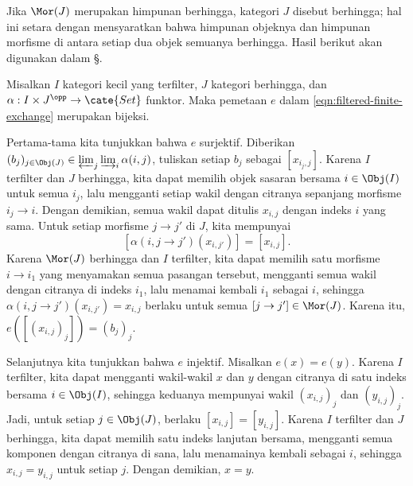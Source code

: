 Jika $\Mor(J)$ merupakan himpunan berhingga, kategori $J$ disebut berhingga;
hal ini setara dengan mensyaratkan bahwa himpunan objeknya dan himpunan
morfisme di antara setiap dua objek semuanya berhingga. Hasil berikut akan
digunakan dalam \S{}.

\begin{proposisi}\label{prop:filtered-finite-exchange}
	Misalkan $I$ kategori kecil yang terfilter, $J$ kategori berhingga, dan
	$\alpha: I \times J^{\opp} \to \cate{Set}$ funktor. Maka pemetaan $e$ dalam
	\eqref{eqn:filtered-finite-exchange} merupakan bijeksi.
\end{proposisi}
\begin{bukti}
	Pertama-tama kita tunjukkan bahwa $e$ surjektif. Diberikan
	$(b_j)_{j \in \Obj(J)} \in \varprojlim_j \varinjlim_i \alpha(i, j)$,
	tuliskan setiap $b_j$ sebagai $[x_{i_j, j}]$. Karena $I$ terfilter dan $J$
	berhingga, kita dapat memilih objek sasaran bersama $i\in\Obj(I)$ untuk
	semua $i_j$, lalu mengganti setiap wakil dengan citranya sepanjang morfisme
	$i_j\to i$.
	Dengan demikian, semua wakil dapat ditulis $x_{i,j}$ dengan indeks $i$ yang
	sama. Untuk setiap morfisme $j \to j'$ di $J$, kita mempunyai
	\[ \left[ \alpha(i, j \to j') (x_{i, j'}) \right] = \left[ x_{i, j} \right]. \]
	Karena $\Mor(J)$ berhingga dan $I$ terfilter, kita dapat memilih satu
	morfisme $i\to i_1$ yang menyamakan semua pasangan tersebut, mengganti
	semua wakil dengan citranya di indeks $i_1$,
	lalu menamai
	kembali $i_1$ sebagai $i$, sehingga
	$\alpha(i, j \to j') (x_{i, j'}) = x_{i, j}$ berlaku untuk semua
	$[j \to j'] \in \Mor(J)$. Karena itu,
	$e\left( [(x_{i, j})_j] \right) = (b_j)_j$.

	Selanjutnya kita tunjukkan bahwa $e$ injektif. Misalkan $e(x) = e(y)$.
	Karena $I$ terfilter, kita dapat mengganti wakil-wakil $x$ dan $y$ dengan
	citranya di satu indeks bersama $i\in\Obj(I)$, sehingga keduanya mempunyai wakil
	$(x_{i,j})_j$ dan $(y_{i,j})_j$. Jadi, untuk setiap $j \in \Obj(J)$,
	berlaku $[x_{i,j}]=[y_{i,j}]$. Karena $I$ terfilter dan $J$ berhingga, kita
	dapat memilih satu indeks lanjutan bersama, mengganti semua komponen dengan
	citranya di sana, lalu menamainya kembali sebagai $i$, sehingga
	$x_{i,j}=y_{i,j}$ untuk setiap
	$j$. Dengan demikian, $x=y$.
\end{bukti}
